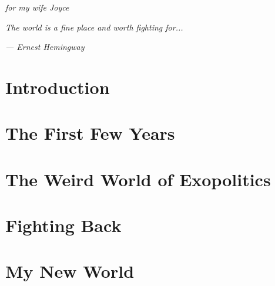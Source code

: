 \documentclass[letterpaper,11pt,twoside,titlepage,onecolumn,openany]{book}
\begin{document}
\vspace{40mm}
\begin{center}

\textit{for my wife Joyce}

\vspace{10mm}

\textit{The world is a fine place and worth fighting for...}

\vspace{10mm}

\textit{--- Ernest Hemingway}

\end{center}

\newpage


\tableofcontents
\thispagestyle{empty}

\part{Introduction}



\part{The First Few Years}







\part{The Weird World of Exopolitics}







\part{Fighting Back}









\part{My New World}
\end{document}
